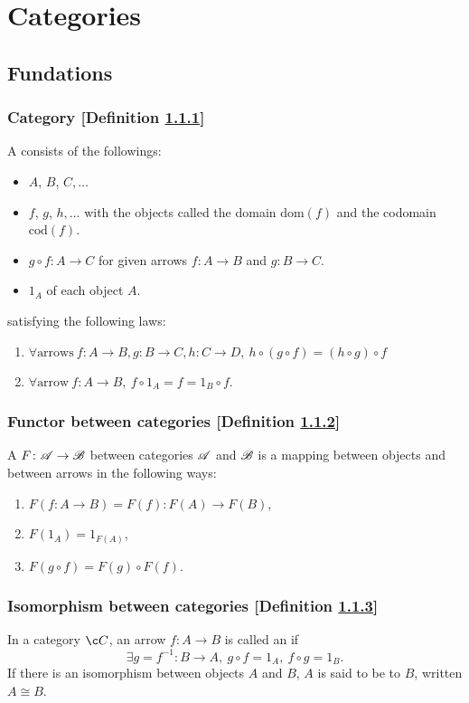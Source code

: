 \newcommand{\sets}{\mathbf{Sets}}
\section{Categories}
\subsection{Fundations}
\subsubsection{Category [Definition \ref{category}]}\label{category}
A  consists of the followings:
\begin{itemize}
\item {} $A$, $B$, $C, \dotsc$
\item {} $f$, $g$, $h, \dotsc$ with the objects called the domain $\mathrm{dom}(f)$ and the codomain $\mathrm{cod}(f)$.
\item {} $g \circ f \colon A \to C$ for given arrows $f \colon A \to B$ and $g \colon B \to C$.
\item {} $1_A$ of each object $A$.
\end{itemize}
satisfying the following laws:
\begin{enumerate}
\item $\forall \text{arrows}\ f \colon A \to B, g \colon B \to C, h \colon C \to D,\ h \circ (g \circ f) = (h \circ g) \circ f$
\item $\forall \text{arrow}\ f \colon A \to B,\ f \circ 1_A = f = 1_B \circ f$.
\end{enumerate}

\subsubsection{Functor between categories [Definition \ref{functor-between-categories}]}\label{functor-between-categories}
A  $F\colon \mathscr{A} \to \mathscr{B}$ between categories $\mathscr{A}$ and $\mathscr{B}$ is a mapping between objects and between arrows in the following ways:
\begin{enumerate}
\item $F(f\colon A \to B) = F(f) \colon F(A) \to F(B)$,
\item $F(1_A) = 1_{F(A)}$,
\item $F(g \circ f) = F(g) \circ F(f)$.    
\end{enumerate}

\subsubsection{Isomorphism between categories [Definition \ref{isomorphism-between-categories}]}\label{isomorphism-between-categories}
In a category $\c C$, an arrow $f \colon A \to B$ is called an  if
\[
\exists g = f^{-1} \colon B \to A,\ g \circ f = 1_A,\ f \circ g = 1_B.
\]
If there is an isomorphism between objects $A$ and $B$, $A$ is said to be  to $B$, written $A \cong B$.